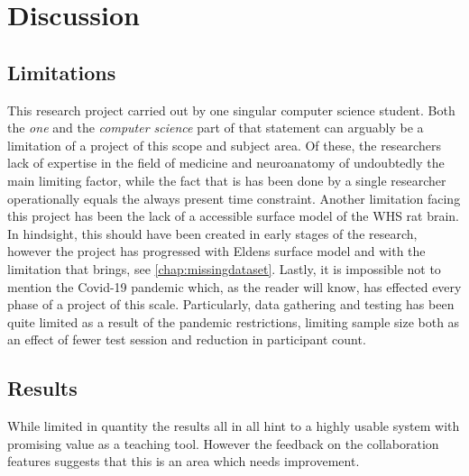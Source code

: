 \chapter{Discussion}

\section{Limitations}



This research project carried out by one singular computer science student. Both the \textit{one} and the \textit{computer science} part of that statement can arguably be a limitation of a project of this scope and subject area. Of these, the researchers lack of expertise in the field of medicine and neuroanatomy of undoubtedly the main limiting factor, while the fact that is has been done by a single researcher operationally equals the always present time constraint. Another limitation facing this project has been the lack of a accessible surface model of the WHS rat brain. In hindsight, this should have been created in early stages of the research, however the project has progressed with Eldens surface model and with the limitation that brings, see \autoref{chap:missingdataset}. Lastly, it is impossible not to mention the Covid-19 pandemic which, as the reader will know, has effected every phase of a project of this scale. Particularly, data gathering and testing has been quite limited as a result of the pandemic restrictions, limiting sample size both as an effect of fewer test session and reduction in participant count.

\section{Results}

While limited in quantity the results all in all hint to a highly usable system with promising value as a teaching tool. However the feedback on the collaboration features suggests that this is an area which needs improvement.

